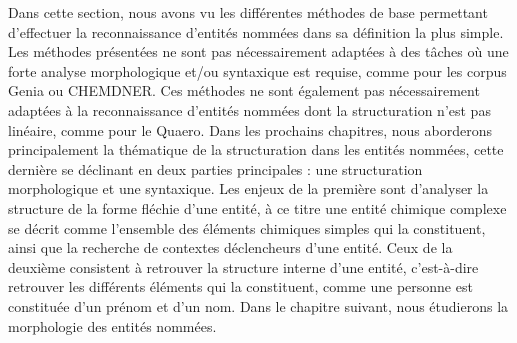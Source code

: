 \documentclass[PhD-Yoann-Dupont.tex]{subfiles}
\begin{document}
Dans cette section, nous avons vu les différentes méthodes de base permettant d'effectuer la reconnaissance d'entités nommées dans sa définition la plus simple. Les méthodes présentées ne sont pas nécessairement adaptées à des tâches où une forte analyse morphologique et/ou syntaxique est requise, comme pour les corpus Genia ou CHEMDNER. Ces méthodes ne sont également pas nécessairement adaptées à la reconnaissance d'entités nommées dont la structuration n'est pas linéaire, comme pour le Quaero. Dans les prochains chapitres, nous aborderons principalement la thématique de la structuration dans les entités nommées, cette dernière se déclinant en deux parties principales : une structuration morphologique et une syntaxique. Les enjeux de la première sont d'analyser la structure de la forme fléchie d'une entité, à ce titre une entité chimique complexe se décrit comme l'ensemble des éléments chimiques simples qui la constituent, ainsi que la recherche de contextes déclencheurs d'une entité. Ceux de la deuxième consistent à retrouver la structure interne d'une entité, c'est-à-dire retrouver les différents éléments qui la constituent, comme une personne est constituée d'un prénom et d'un nom. Dans le chapitre suivant, nous étudierons la morphologie des entités nommées.
\end{document}
